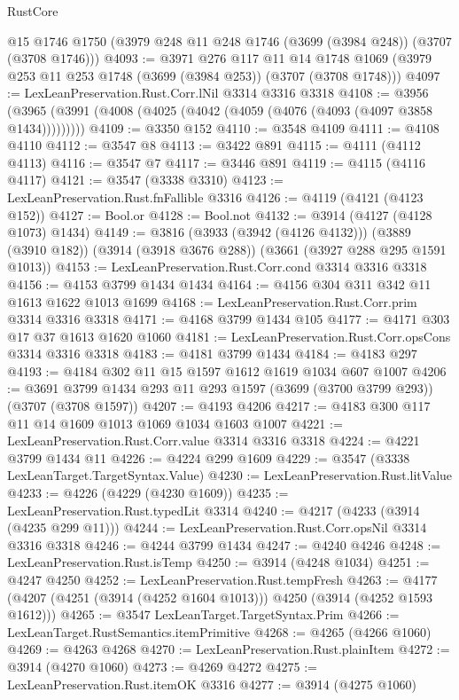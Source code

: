 \begin{lexlean}{RustCore}
\begin{coremodule}
    @15
    @1746
    @1750
    (@3979 @248 @11 @248 @1746 (@3699 (@3984 @248)) (@3707 (@3708 @1746)))
@4093 := @3971
    @276
    @117
    @11
    @14
    @1748
    @1069
    (@3979 @253 @11 @253 @1748 (@3699 (@3984 @253)) (@3707 (@3708 @1748)))
@4097 := LexLeanPreservation.Rust.Corr.lNil @3314 @3316 @3318
@4108 := @3956 (@3965 (@3991 (@4008 (@4025 (@4042 (@4059 (@4076 (@4093 (@4097 @3858 @1434)))))))))
@4109 := @3350 @152
@4110 := @3548 @4109
@4111 := @4108 @4110
@4112 := @3547 @8
@4113 := @3422 @891
@4115 := @4111 (@4112 @4113)
@4116 := @3547 @7
@4117 := @3446 @891
@4119 := @4115 (@4116 @4117)
@4121 := @3547 (@3338 @3310)
@4123 := LexLeanPreservation.Rust.fnFallible @3316
@4126 := @4119 (@4121 (@4123 @152))
@4127 := Bool.or
@4128 := Bool.not
@4132 := @3914 (@4127 (@4128 @1073) @1434)
@4149 := @3816
    (@3933 (@3942 (@4126 @4132)))
    (@3889 (@3910 @182))
    (@3914 (@3918 @3676 @288))
    (@3661 (@3927 @288 @295 @1591 @1013))
@4153 := LexLeanPreservation.Rust.Corr.cond @3314 @3316 @3318
@4156 := @4153 @3799 @1434 @1434
@4164 := @4156 @304 @311 @342 @11 @1613 @1622 @1013 @1699
@4168 := LexLeanPreservation.Rust.Corr.prim @3314 @3316 @3318
@4171 := @4168 @3799 @1434 @105
@4177 := @4171 @303 @17 @37 @1613 @1620 @1060
@4181 := LexLeanPreservation.Rust.Corr.opsCons @3314 @3316 @3318
@4183 := @4181 @3799 @1434
@4184 := @4183 @297
@4193 := @4184 @302 @11 @15 @1597 @1612 @1619 @1034 @607 @1007
@4206 := @3691 @3799 @1434 @293 @11 @293 @1597 (@3699 (@3700 @3799 @293)) (@3707 (@3708 @1597))
@4207 := @4193 @4206
@4217 := @4183 @300 @117 @11 @14 @1609 @1013 @1069 @1034 @1603 @1007
@4221 := LexLeanPreservation.Rust.Corr.value @3314 @3316 @3318
@4224 := @4221 @3799 @1434 @11
@4226 := @4224 @299 @1609
@4229 := @3547 (@3338 LexLeanTarget.TargetSyntax.Value)
@4230 := LexLeanPreservation.Rust.litValue
@4233 := @4226 (@4229 (@4230 @1609))
@4235 := LexLeanPreservation.Rust.typedLit @3314
@4240 := @4217 (@4233 (@3914 (@4235 @299 @11)))
@4244 := LexLeanPreservation.Rust.Corr.opsNil @3314 @3316 @3318
@4246 := @4244 @3799 @1434
@4247 := @4240 @4246
@4248 := LexLeanPreservation.Rust.isTemp
@4250 := @3914 (@4248 @1034)
@4251 := @4247 @4250
@4252 := LexLeanPreservation.Rust.tempFresh
@4263 := @4177 (@4207 (@4251 (@3914 (@4252 @1604 @1013))) @4250 (@3914 (@4252 @1593 @1612)))
@4265 := @3547 LexLeanTarget.TargetSyntax.Prim
@4266 := LexLeanTarget.RustSemantics.itemPrimitive
@4268 := @4265 (@4266 @1060)
@4269 := @4263 @4268
@4270 := LexLeanPreservation.Rust.plainItem
@4272 := @3914 (@4270 @1060)
@4273 := @4269 @4272
@4275 := LexLeanPreservation.Rust.itemOK @3316
@4277 := @3914 (@4275 @1060)

\end{coremodule}
\end{lexlean}
